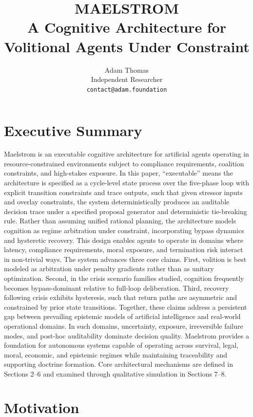 \documentclass[11pt,a4paper]{article}
\title{\textbf{MAELSTROM}\\[0.5em]\large A Cognitive Architecture for Volitional Agents Under Constraint}
\author{Adam Thomas\\
\small Independent Researcher\\
\small \texttt{contact@adam.foundation}}
\date{}
\begin{document}
\maketitle

\section*{Executive Summary}

Maelstrom is an executable cognitive architecture for artificial agents operating in resource-constrained environments subject to compliance requirements, coalition constraints, and high-stakes exposure. In this paper, ``executable'' means the architecture is specified as a cycle-level state process over the five-phase loop with explicit transition constraints and trace outputs, such that given stressor inputs and overlay constraints, the system deterministically produces an auditable decision trace under a specified proposal generator and deterministic tie-breaking rule. Rather than assuming unified rational planning, the architecture models cognition as regime arbitration under constraint, incorporating bypass dynamics and hysteretic recovery. This design enables agents to operate in domains where latency, compliance requirements, moral exposure, and termination risk interact in non-trivial ways. The system advances three core claims. First, volition is best modeled as arbitration under penalty gradients rather than as unitary optimization. Second, in the crisis scenario families studied, cognition frequently becomes bypass-dominant relative to full-loop deliberation. Third, recovery following crisis exhibits hysteresis, such that return paths are asymmetric and constrained by prior state transitions. Together, these claims address a persistent gap between prevailing epistemic models of artificial intelligence and real-world operational domains. In such domains, uncertainty, exposure, irreversible failure modes, and post-hoc auditability dominate decision quality. Maelstrom provides a foundation for autonomous systems capable of operating across survival, legal, moral, economic, and epistemic regimes while maintaining traceability and supporting doctrine formation. Core architectural mechanisms are defined in Sections 2--6 and examined through qualitative simulation in Sections 7--8.

\section{Motivation}
\end{document}
